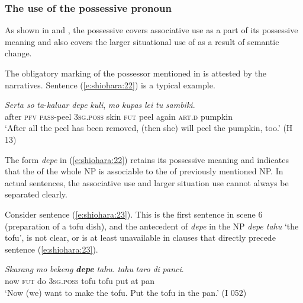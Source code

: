 \documentclass[output=paper
,modfonts
,nonflat]{langsci/langscibook}
\begin{document}
\subsubsection{\label{s4.2.3}The use of the possessive pronoun}

As shown in  and , the possessive covers  associative use as a part of its possessive meaning and also covers the larger situational use of \citet{Hawkins2015} as a result of semantic change.

The obligatory marking of the possessor mentioned in  is attested by the narratives. Sentence (\ref{e:shiohara:22}) is a typical example.

\begin{exe}
	\ex\label{e:shiohara:22}
	\gll \textit{Serta}  \textit{so}  \textit{ta}-\textit{kaluar}   \textit{depe}     \textit{kuli}, \textit{mo}   \textit{kupas}   \textit{lei}   \textit{tu}   \textit{sambiki}.\\
	after  \textsc{pfv}  \textsc{pass}-peel  \textsc{3sg.poss}   skin \textsc{fut}  peel  again  \textsc{art.d}  pumpkin\\
	\glt ‘After all the peel has been removed, (then she) will peel the pumpkin, too.’ \hfill{(H 13)}
\end{exe}

\noindent
The form \textit{depe} in (\ref{e:shiohara:22}) retains its possessive meaning and indicates that the  of the whole NP is associable to the  of previously mentioned NP. In actual sentences, the associative use and larger situation use cannot always be separated clearly. 

Consider sentence (\ref{e:shiohara:23}). This is the first sentence in scene 6 (preparation of a tofu dish), and the antecedent of \textit{depe} in the NP \textit{depe tahu} ‘the tofu’, is not clear, or is at least unavailable in clauses that directly precede sentence (\ref{e:shiohara:23}).

\begin{exe}
	\ex\label{e:shiohara:23}
	\gll \textit{Skarang}  \textit{mo}  \textit{bekeng} \textbf{\textit{depe}} \textit{tahu}.   \textit{tahu} \textit{taro} \textit{di} \textit{panci}.\\
	now    \textsc{fut}  do \textsc{3sg.poss}   tofu   tofu put at pan\\
	\glt ‘Now (we) want to make the tofu. Put the tofu in the pan.’ \hfill{(I 052)}
\end{exe}
\end{document}

